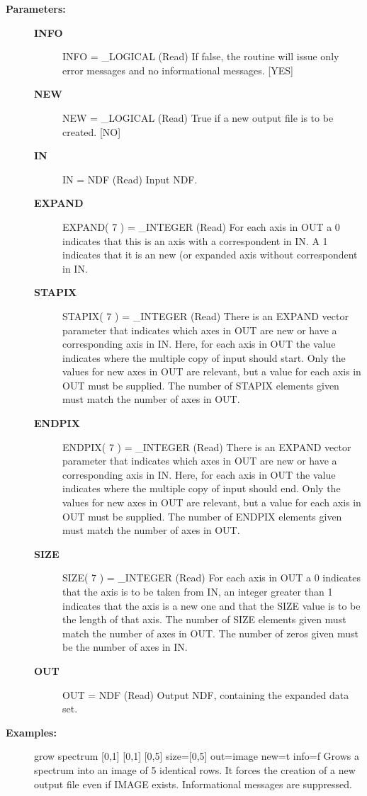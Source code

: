 \begin{description}
\begin{description}
\item [\textbf{Parameters:}]
\begin{description}
\item [\textbf{INFO}]
INFO = \_LOGICAL (Read)
   If false, the routine will issue only error messages and no
   informational messages. [YES]
\item [\textbf{NEW}]
NEW = \_LOGICAL (Read)
   True if a new output file is to be created. [NO]
\item [\textbf{IN}]
IN = NDF (Read)
   Input NDF.
\item [\textbf{EXPAND}]
EXPAND( 7 ) = \_INTEGER (Read)
   For each axis in OUT a 0 indicates that this is an axis with a
   correspondent in IN. A 1 indicates that it is an new (or expanded
   axis without correspondent in IN.
\item [\textbf{STAPIX}]
STAPIX( 7 ) = \_INTEGER (Read)
   There is an EXPAND vector parameter that indicates which axes in
   OUT are new or have a corresponding axis in IN. Here, for each
   axis in OUT the value indicates where the multiple copy of input
   should start. Only the values for new axes in OUT are relevant,
   but a value for each axis in OUT must be supplied. The number of
   STAPIX elements given must match the number of axes in OUT.
\item [\textbf{ENDPIX}]
ENDPIX( 7 ) = \_INTEGER (Read)
   There is an EXPAND vector parameter that indicates which axes in
   OUT are new or have a corresponding axis in IN. Here, for each
   axis in OUT the value indicates where the multiple copy of input
   should end. Only the values for new axes in OUT are relevant,
   but a value for each axis in OUT must be supplied. The number of
   ENDPIX elements given must match the number of axes in OUT.
\item [\textbf{SIZE}]
SIZE( 7 ) = \_INTEGER (Read)
   For each axis in OUT a 0 indicates that the axis is to be taken
   from IN, an integer greater than 1 indicates that the axis is
   a new one and that the SIZE value is to be the length of that
   axis. The number of SIZE elements given must match the number
   of axes in OUT. The number of zeros given must be the number of
   axes in IN.
\item [\textbf{OUT}]
OUT = NDF (Read)
   Output NDF, containing the expanded data set.
\end{description}

\item [\textbf{Examples:}]
\begin{terminalv}
grow spectrum [0,1] [0,1] [0,5] size=[0,5] out=image new=t info=f
   Grows a spectrum into an image of 5 identical rows. It forces
   the creation of a new output file even if IMAGE exists.
   Informational messages are suppressed.


\end{terminalv}
\end{description}
\end{description}
